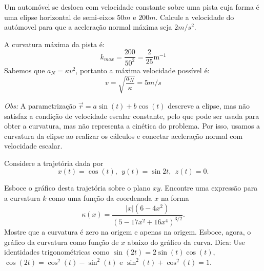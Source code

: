 \begin{exeresol}
Um automóvel se desloca com velocidade constante sobre uma pista cuja forma é uma elipse horizontal de semi-eixos $50m$ e $200m$. Calcule a velocidade do autómovel para que a aceleração normal máxima seja $2m/s^2$.

\end{exeresol}
\begin{resol}
  A curvatura máxima da pista é:
  $$k_{max}=\frac{200}{50^2}=\frac{2}{25}\text{m}^{-1}$$
  Sabemos que $a_N=\kappa v^2$, portanto a máxima velocidade possível é:
  $$v=\sqrt{\frac{a_N}{\kappa}}=5m/s$$

  {\it Obs:}
 A parametrização $\vec{r}=a\sin (t) + b\cos (t)$ descreve a elipse, mas não satisfaz a condição de velocidade escalar constante, pelo que pode ser usada para obter a curvatura, mas não representa a cinética do problema. Por isso, usamos a curvatura da elipse ao realizar os cálculos e conectar aceleração normal com velocidade escalar.
\end{resol}
\begin{exeresol}
Considere a trajetória  dada por
$$x(t)=\cos(t),~~  y(t)=\sin 2t,~~ z(t)=0.$$

Esboce o gráfico desta trajetória sobre o plano $xy$. Encontre uma expressão para a curvatura $k$ como uma função da coordenada $x$ na forma $$\kappa(x)=\frac{|x|(6-4x^2)}{\left(5-17x^2+16x^4\right)^{3/2}}.$$ Mostre que a curvatura é zero na origem e apenas na origem. Esboce, agora, o gráfico da curvatura como função de $x$ abaixo do gráfico da curva.
Dica: Use identidades trigonométricas como $\sin(2t)=2\sin(t)\cos(t)$, $\cos(2t)=\cos^2(t)-\sin^2(t)$ e $\sin^2(t)+\cos^2(t)=1$.
\end{exeresol}

